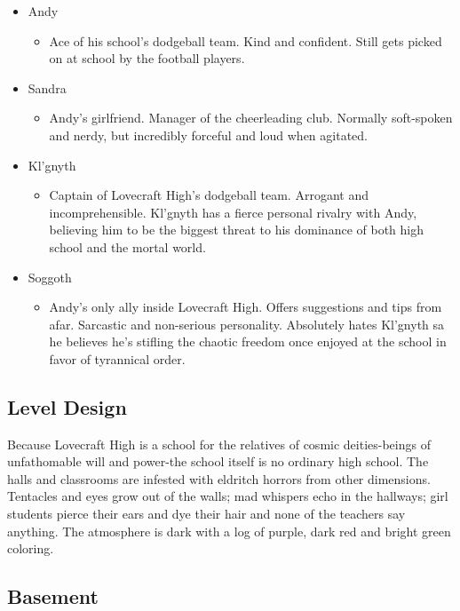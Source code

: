 \documentclass [12pt]{article}
\begin{document}
\begin{itemize}
\item Andy
	\begin{itemize}
	\item Ace of his school's dodgeball team. Kind and confident. Still gets picked on at school by the football players.
	\end{itemize}

\item Sandra
	\begin{itemize}
	\item Andy's girlfriend. Manager of the cheerleading club. Normally soft-spoken and nerdy, but incredibly forceful and loud when agitated.
	\end{itemize}

\item Kl'gnyth
	\begin{itemize}
	\item Captain of Lovecraft High's dodgeball team. Arrogant and incomprehensible. Kl'gnyth has a fierce personal rivalry with Andy, believing him to be the biggest threat to his dominance of both high school and the mortal world.
	\end{itemize}


\item Soggoth
	\begin{itemize}
	\item Andy's only ally inside Lovecraft High. Offers suggestions and tips from afar. Sarcastic and non-serious personality. Absolutely hates Kl'gnyth sa he believes he's stifling the chaotic freedom once enjoyed at the school in favor of tyrannical order.
	\end{itemize}
\end{itemize}

\subsection*{Level Design}

Because Lovecraft High is a school for the relatives of cosmic deities-beings of unfathomable will and power-the school itself is no ordinary high school. The halls and classrooms are infested with eldritch horrors from other dimensions. Tentacles and eyes grow out of the walls; mad whispers echo in the hallways; girl students pierce their ears and dye their hair and none of the teachers say anything. The atmosphere is dark with a log of purple, dark red and bright green coloring.

\subsection*{Basement}
\end{document}

